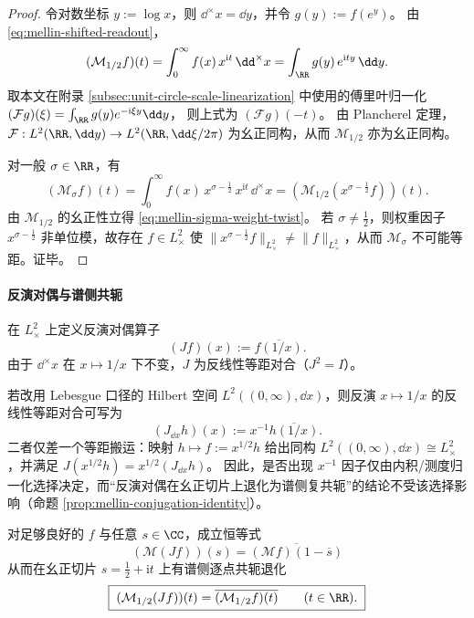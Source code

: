 \begin{proof}
令对数坐标 \(y:=\log x\)，则 \(\dd^{\times}x=\dd y\)，并令 \(g(y):=f(e^{y})\)。
由 \eqref{eq:mellin-shifted-readout}，
\[
(\mathcal{M}_{1/2}f)(t)
=\int_{0}^{\infty} f(x)\,x^{\mathrm{i}t}\,\dd^{\times}x
=\int_{\RR} g(y)\,e^{\mathrm{i}ty}\,\dd y.
\]
取本文在附录 \ref{subsec:unit-circle-scale-linearization} 中使用的傅里叶归一化
\(
(\mathcal{F}g)(\xi)=\int_{\RR}g(y)e^{-\mathrm{i}\xi y}\dd y
\)，
则上式为 \((\mathcal{F}g)(-\!t)\)。
由 Plancherel 定理，\(\mathcal{F}:L^{2}(\RR,\dd y)\to L^{2}(\RR,\dd\xi/2\pi)\) 为幺正同构，从而 \(\mathcal{M}_{1/2}\) 亦为幺正同构。
\par
对一般 \(\sigma\in\RR\)，有
\[
(\mathcal{M}_{\sigma}f)(t)
=\int_{0}^{\infty} f(x)\,x^{\sigma-\frac12}\,x^{\mathrm{i}t}\,\dd^{\times}x
=(\mathcal{M}_{1/2}(x^{\sigma-\frac12}f))(t).
\]
由 \(\mathcal{M}_{1/2}\) 的幺正性立得 \eqref{eq:mellin-sigma-weight-twist}。
若 \(\sigma\neq\tfrac12\)，则权重因子 \(x^{\sigma-\frac12}\) 非单位模，故存在 \(f\in L^{2}_{\times}\) 使 \(\|x^{\sigma-\frac12}f\|_{L^{2}_{\times}}\neq\|f\|_{L^{2}_{\times}}\)，从而 \(\mathcal{M}_{\sigma}\) 不可能等距。证毕。
\end{proof}

\paragraph{反演对偶与谱侧共轭}
在 \(L^{2}_{\times}\) 上定义反演对偶算子
\[
(Jf)(x):=\overline{f(1/x)}.
\]
由于 \(\dd^{\times}x\) 在 \(x\mapsto 1/x\) 下不变，\(J\) 为反线性等距对合（\(J^{2}=I\)）。

\begin{remark}\label{rem:mellin-inversion-jacobian}
若改用 Lebesgue 口径的 Hilbert 空间 \(L^{2}((0,\infty),\dd x)\)，则反演 \(x\mapsto 1/x\) 的反线性等距对合可写为
\[
(J_{\dd x}h)(x):=x^{-1}\overline{h(1/x)}.
\]
二者仅差一个等距搬运：映射 \(h\mapsto f:=x^{1/2}h\) 给出同构 \(L^{2}((0,\infty),\dd x)\cong L^{2}_{\times}\)，并满足
\(
J(x^{1/2}h)=x^{1/2}(J_{\dd x}h)
\)。
因此，是否出现 \(x^{-1}\) 因子仅由内积/测度归一化选择决定，而“反演对偶在幺正切片上退化为谱侧复共轭”的结论不受该选择影响（命题 \ref{prop:mellin-conjugation-identity}）。
\end{remark}

\begin{proposition}\label{prop:mellin-conjugation-identity}
对足够良好的 \(f\) 与任意 \(s\in\CC\)，成立恒等式
\[
\boxed{\;(\mathcal{M}(Jf))(s)=\overline{(\mathcal{M}f)(1-\overline{s})}\;}
\]
从而在幺正切片 \(s=\tfrac12+\mathrm{i}t\) 上有谱侧逐点共轭退化
\[
\boxed{\;(\mathcal{M}_{1/2}(Jf))(t)=\overline{(\mathcal{M}_{1/2}f)(t)}\qquad(t\in\RR).\;}
\]
\end{proposition}

